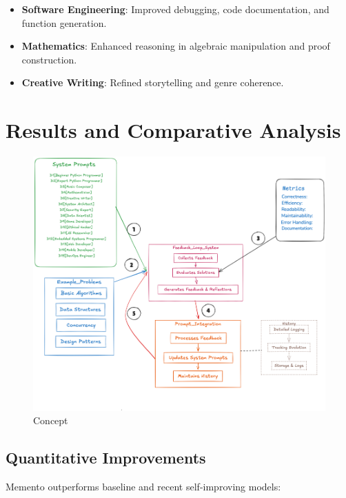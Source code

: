 \documentclass[10pt,a4paper,twocolumn]{article}
\begin{document}
\begin{itemize}
    \item \textbf{Software Engineering}: Improved debugging, code documentation, and function generation.
    \item \textbf{Mathematics}: Enhanced reasoning in algebraic manipulation and proof construction.
    \item \textbf{Creative Writing}: Refined storytelling and genre coherence.
\end{itemize}





\section{{\textbf{Results and Comparative Analysis} } }


\begin{figure}
    \centering
    \includegraphics[width=1\linewidth]{concept.png}
    \caption{Concept}
    \label{concept}
\end{figure}



\subsection{Quantitative Improvements}


 Memento outperforms baseline and recent self-improving models:
\end{document}
